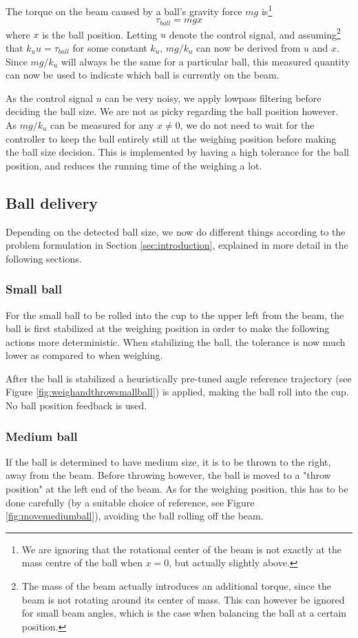 The torque on the beam caused by a ball's gravity force $mg$ is\footnote{We are ignoring that the rotational center of the beam is not exactly at the mass centre of the ball when $x=0$, but actually slightly above.}
\[
\tau_{ball} = mgx
\]
where $x$ is the ball position. Letting $u$ denote the control signal, and assuming\footnote{The mass of the beam actually introduces an additional torque, since the beam is not rotating around its center of mass.
This can however be ignored for small beam angles, which is the case when balancing the ball at a certain position.} that $k_u u = \tau_{ball}$ for some constant $k_u$, $mg/k_u$ can now be derived from $u$ and $x$.
Since $mg/k_u$ will always be the same for a particular ball, this measured quantity can now be used to indicate which ball is currently on the beam.

As the control signal $u$ can be very noisy, we apply lowpass filtering before deciding the ball size.
We are not as picky regarding the ball position however.
As $mg/k_u$ can be measured for any $x\neq0$, we do not need to wait for the controller to keep the ball entirely still at the weighing position before making the ball size decision.
This is implemented by having a high tolerance for the ball position, and reduces the running time of the weighing a lot.

\subsection{Ball delivery}\label{sec:ball_delivery}
Depending on the detected ball size, we now do different things according to the problem formulation in Section \ref{sec:introduction}, explained in more detail in the following sections.

\subsubsection{Small ball}\label{sec:small_ball_delivery}
For the small ball to be rolled into the cup to the upper left from the beam, the ball is first stabilized at the weighing position in order to make the following actions more deterministic.
When stabilizing the ball, the tolerance is now much lower as compared to when weighing.

After the ball is stabilized a heuristically pre-tuned angle reference trajectory (see Figure \ref{fig:weighandthrowsmallball}) is applied, making the ball roll into the cup.
No ball position feedback is used.

\subsubsection{Medium ball}\label{sec:medium_ball_delivery}
If the ball is determined to have medium size, it is to be thrown to the right, away from the beam.
Before throwing however, the ball is moved to a "throw position" at the left end of the beam.
As for the weighing position, this has to be done carefully (by a suitable choice of reference, see Figure \ref{fig:movemediumball}), avoiding the ball rolling off the beam.

